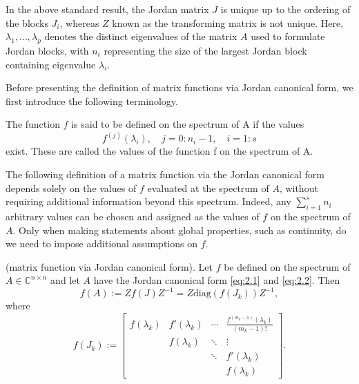 In the above standard result, the Jordan matrix $J$ is unique up to the ordering of the blocks $J_i$, whereas $Z$ known as the transforming matrix is not unique. Here, $\lambda_1,...,\lambda_p$ denotes the distinct eigenvalues of the matrix $A$ used to formulate Jordan blocks, with $n_i$ representing the size of the largest Jordan block containing eigenvalue $\lambda_i$.

Before presenting the definition of matrix functions via Jordan canonical form, we first introduce the following terminology.

\begin{definition}
    \label{def:2.2}
    \cite{8}The function $f$ is said to be defined on the spectrum of A if the values
    \[
        f^{(j)}(\lambda_i), \quad j=0:n_i-1, \quad i=1:s
    \]
    exist. These are called the values of the function f on the spectrum of A.
\end{definition}

The following definition of a matrix function via the Jordan canonical form depends solely on the values of $f$ evaluated at the spectrum of $A$, without requiring additional information beyond this spectrum. Indeed, any $\sum_{i=1}^s n_i$ arbitrary values can be chosen and assigned as the values of $f$ on the spectrum of $A$. Only when making statements about global properties, such as continuity, do we need to impose additional assumptions on $f$.

\begin{definition}
    \label{def:2.3}
    \cite{8}(matrix function via Jordan canonical form). Let $f$ be defined on the spectrum of $A \in \mathbb{C}^{n \times n}$ and let $A$ have the Jordan canonical form \eqref{eq:2.1} and \eqref{eq:2.2}. Then
    \begin{equation}
        f(A) := Zf(J)Z^{-1} = Z \mathrm{diag}(f(J_k))Z^{-1},
        \label{eq:2.3}
    \end{equation}
    where
    \begin{equation}
        f(J_k) :=
        \begin{bmatrix}
            f(\lambda_k) & f'(\lambda_k) & \cdots & \frac{f^{(m_k-1)}(\lambda_k)}{(m_k-1)!} \\
            & f(\lambda_k) & \ddots & \vdots \\
            & & \ddots & f'(\lambda_k) \\
            & & & f(\lambda_k)
        \end{bmatrix}.
        \label{eq:2.4}
    \end{equation}
\end{definition}


